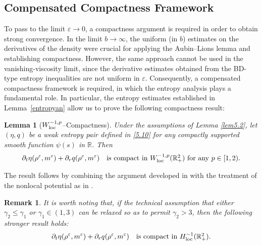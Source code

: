 \documentclass[reqno,11pt]{amsart}
\numberwithin{equation}{section}
\newtheorem{lemma}[theorem]{Lemma}
\newtheorem{remark}[theorem]{Remark}
\theoremstyle{definition}
\def\v{\varepsilon}
\begin{document}
\subsection{Compensated Compactness Framework}
To pass to the limit $\varepsilon \to 0$, a compactness argument is required in order to obtain strong convergence. 
In the limit $b \to \infty$, the uniform (in $b$) estimates on the derivatives of the density were crucial for applying the Aubin–Lions lemma and establishing compactness. However, the same approach cannot be used in the vanishing-viscosity limit, since the derivative estimates obtained from the BD-type entropy inequalities are not uniform in $\varepsilon$.
Consequently, a compensated compactness framework is required, in which the entropy analysis 
plays a fundamental role. 
In particular, the entropy estimates established in Lemma~\ref{entropyan} allow us 
to prove the following compactness result:

\begin{lemma}[$W_{\rm loc}^{-1,p}$--Compactness]\label{compacty}
Under the assumptions of {\rm Lemma {\rm \ref{lem5.2}}}, let $(\eta, q)$ be a weak entropy pair defined in \eqref{5.10}
for any compactly supported smooth function $\psi(s)$ in $\mathbb{R}$. Then
\begin{align*}
	\partial_t\eta(\rho^\v,m^\v)+\partial_rq(\rho^\v,m^\v) \quad \mbox{is compact in $ W^{-1,p}_{\rm loc}(\mathbb{R}^2_+)$} \text{ for any } p \in [1,2).
\end{align*}
\end{lemma}

The result follows by combining the argument developed in \cite[Lemma 7.1]{Chen_2024} with the treatment of the nonlocal potential as in \cite[Lemma 4.11]{Carrillo2025}.

\begin{remark}
It is worth noting that, if the technical assumption that either
$\gamma_2 \leq \gamma_1$ or $\gamma_1 \in (1,3)$ can be relaxed so as to permit 
$\gamma_2>3$, then the following stronger result holds{\rm :}
    \[
 \partial_t\eta(\rho^\v,m^\v)+\partial_rq(\rho^\v,m^\v) \quad \mbox{is compact in $ H^{-1}_{\rm loc}(\mathbb{R}^2_+)$}.
    \]
\end{remark}
\end{document}
